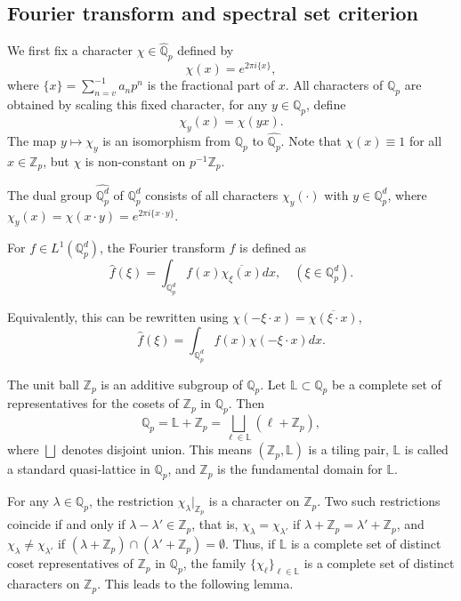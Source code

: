 \documentclass[a4paper,12pt]{amsart}
\def\Q{\mathbb{Q}}
\def\Zp{\mathbb{Z}_p}
\def\Qp{\mathbb{Q}_p}
\begin{document}
\subsection{Fourier transform and  spectral set criterion}

We first fix a character $\chi \in \widehat{\Q}_p$ defined by
$$\chi(x)=e^{2\pi i\{x\}},$$
where \(\{x\} = \sum_{n=v}^{-1} a_n p^n\) is the fractional part of \(x\). All characters of \(\Qp\)
are obtained by scaling this fixed character, for any \(y \in \Qp\), define \[\chi_y(x) = \chi(yx).\]
The map \(y \mapsto \chi_y\) is an isomorphism from \(\Qp\) to \(\widehat{\Qp}\).
Note that \(\chi(x) \equiv 1\) for all \(x \in \Zp\), but \(\chi\) is non-constant on \(p^{-1}\Zp\).

The dual group \(\widehat{\Qp^d}\) of \(\Qp^d\) consists of all characters \(\chi_y(\cdot)\) with \(y \in \Qp^d\),
where \(\chi_y(x) = \chi(x \cdot y) = e^{2\pi i \{x \cdot y\}}\).

For \(f \in L^1(\Qp^d)\), the Fourier transform \(\widehat{f}\) is defined as
$$
\widehat{f}(\xi) =\int_{\Q_p^d}f(x) \overline{\chi_{\xi}(x)} dx, \quad ( \xi\in \Q_p^d).
$$

Equivalently, this can be rewritten using \(\chi(-\xi \cdot x) = \overline{\chi(\xi \cdot x)}\),
\[
\widehat{f}(\xi) = \int_{\Qp^d} f(x) \chi(-\xi \cdot x) dx.
\]

The unit ball \(\Zp\) is an additive subgroup of \(\Qp\). Let \(\mathbb{L} \subset \Qp\) be a complete set of
representatives for the cosets of \(\Zp\) in \(\Qp\). Then
\[
\Qp = \mathbb{L} + \Zp = \bigsqcup_{\ell \in \mathbb{L}} (\ell + \Zp),
\]
where \(\bigsqcup\) denotes  disjoint union. This means \((\Zp, \mathbb{L})\) is a tiling pair,
\(\mathbb{L}\) is called a standard quasi-lattice in \(\Qp\), and \(\Zp\) is
the fundamental domain for \(\mathbb{L}\).

For any \(\lambda \in \Qp\), the restriction \(\chi_\lambda|_{\Zp}\) is a character on \(\Zp\).
Two such restrictions coincide if and only if \(\lambda - \lambda' \in \Zp\), that is,
\(\chi_\lambda = \chi_{\lambda'}\) if \(\lambda + \Zp = \lambda' + \Zp\), and
\(\chi_\lambda \neq \chi_{\lambda'}\) if \((\lambda + \Zp) \cap (\lambda' + \Zp) = \emptyset\).
Thus, if \(\mathbb{L}\) is a complete set of distinct coset representatives of \(\Zp\) in \(\Qp\),
the family \(\{\chi_\ell\}_{\ell \in \mathbb{L}}\) is a complete set of distinct characters on \(\Zp\).
This leads to the following lemma.
\end{document}
